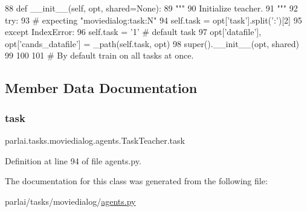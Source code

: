 \begin{DoxyCode}
88     \textcolor{keyword}{def }\_\_init\_\_(self, opt, shared=None):
89         \textcolor{stringliteral}{"""}
90 \textcolor{stringliteral}{        Initialize teacher.}
91 \textcolor{stringliteral}{        """}
92         \textcolor{keywordflow}{try}:
93             \textcolor{comment}{# expecting "moviedialog:task:N"}
94             self.task = opt[\textcolor{stringliteral}{'task'}].split(\textcolor{stringliteral}{':'})[2]
95         \textcolor{keywordflow}{except} IndexError:
96             self.task = \textcolor{stringliteral}{'1'}  \textcolor{comment}{# default task}
97         opt[\textcolor{stringliteral}{'datafile'}], opt[\textcolor{stringliteral}{'cands\_datafile'}] = \_path(self.task, opt)
98         super().\_\_init\_\_(opt, shared)
99 
100 
101 \textcolor{comment}{# By default train on all tasks at once.}
\end{DoxyCode}


\subsection{Member Data Documentation}
\mbox{\label{classparlai_1_1tasks_1_1moviedialog_1_1agents_1_1TaskTeacher_a415ac0cd746556273a07ea8967ed30db}} 
\subsubsection{\texorpdfstring{task}{task}}
{\footnotesize\ttfamily parlai.\+tasks.\+moviedialog.\+agents.\+Task\+Teacher.\+task}



Definition at line 94 of file agents.\+py.



The documentation for this class was generated from the following file\+:\begin{DoxyCompactItemize}
\item 
parlai/tasks/moviedialog/\hyperlink{parlai_2tasks_2moviedialog_2agents_8py}{agents.\+py}\end{DoxyCompactItemize}
